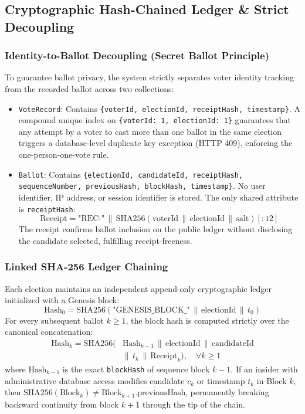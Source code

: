 \documentclass[conference]{IEEEtran}
\begin{document}
\subsection{Cryptographic Hash-Chained Ledger \& Strict Decoupling}

\subsubsection{Identity-to-Ballot Decoupling (Secret Ballot Principle)}
To guarantee ballot privacy, the system strictly separates voter identity tracking from the recorded ballot across two collections:
\begin{itemize}
    \item \texttt{VoteRecord}: Contains \texttt{\{voterId, electionId, receiptHash, timestamp\}}. A compound unique index on \texttt{\{voterId: 1, electionId: 1\}} guarantees that any attempt by a voter to cast more than one ballot in the same election triggers a database-level duplicate key exception (HTTP 409), enforcing the one-person-one-vote rule.
    \item \texttt{Ballot}: Contains \texttt{\{electionId, candidateId, receiptHash, sequenceNumber, previousHash, blockHash, timestamp\}}. No user identifier, IP address, or session identifier is stored. The only shared attribute is \texttt{receiptHash}:
    \begin{equation}
        \text{Receipt} = \text{"REC-"} \,\|\, \text{SHA256}(\text{voterId} \,\|\, \text{electionId} \,\|\, \text{salt})[:12]
    \end{equation}
    The receipt confirms ballot inclusion on the public ledger without disclosing the candidate selected, fulfilling receipt-freeness.
\end{itemize}

\subsubsection{Linked SHA-256 Ledger Chaining}
Each election maintains an independent append-only cryptographic ledger initialized with a Genesis block:
\begin{equation}
    \text{Hash}_0 = \text{SHA256}\left(\text{"GENESIS\_BLOCK\_"} \,\|\, \text{electionId} \,\|\, t_0\right)
\end{equation}
For every subsequent ballot $k \ge 1$, the block hash is computed strictly over the canonical concatenation:
\begin{equation}
\begin{split}
    \text{Hash}_k = \text{SHA256}\Big(& \text{Hash}_{k-1} \,\|\, \text{electionId} \,\|\, \text{candidateId} \\
    & \|\, t_k \,\|\, \text{Receipt}_k \Big), \quad \forall k \ge 1
\end{split}
\end{equation}
where $\text{Hash}_{k-1}$ is the exact \texttt{blockHash} of sequence block $k-1$. If an insider with administrative database access modifies candidate $c_k$ or timestamp $t_k$ in Block $k$, then $\text{SHA256}(\text{Block}_k) \neq \text{Block}_{k+1}.\text{previousHash}$, permanently breaking backward continuity from block $k+1$ through the tip of the chain.
\end{document}
